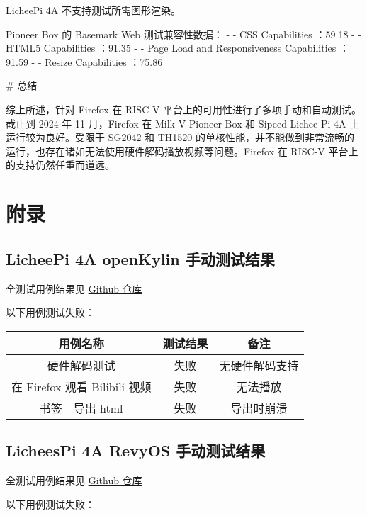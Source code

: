 \documentclass{article}
\begin{document}
\begin{markdown}
LicheePi 4A 不支持测试所需图形渲染。

Pioneer Box 的 Basemark Web 测试兼容性数据：
- - CSS Capabilities ：59.18%
- - HTML5 Capabilities ：91.35%
- - Page Load and Responsiveness Capabilities ：91.59%
- - Resize Capabilities ：75.86%

# 总结

综上所述，针对 Firefox 在 RISC-V 平台上的可用性进行了多项手动和自动测试。截止到 2024 年 11 月，Firefox 在 Milk-V Pioneer Box 和 Sipeed Lichee Pi 4A 上运行较为良好。受限于 SG2042 和 TH1520 的单核性能，并不能做到非常流畅的运行，也存在诸如无法使用硬件解码播放视频等问题。Firefox 在 RISC-V 平台上的支持仍然任重而道远。


\end{markdown}

\newpage
\section{附录}

\appendix

\subsection*{LicheePi 4A openKylin 手动测试结果}

全测试用例结果见 \href{https://github.com/QA-Team-lo/firefox_test/tree/main/l_ok}{Github 仓库}

以下用例测试失败：
\begin{table}[H]
\centering
\begin{tabular}{|c|c|c|}
\hline
\textbf{用例名称} & \textbf{测试结果} & \textbf{备注} \\ \hline
硬件解码测试 & 失败 & 无硬件解码支持 \\ \hline
在 Firefox 观看 Bilibili 视频 & 失败 & 无法播放 \\ \hline
书签 - 导出 html & 失败 & 导出时崩溃 \\ \hline
\end{tabular}
\end{table}

\subsection*{LicheesPi 4A RevyOS 手动测试结果}

全测试用例结果见 \href{https://github.com/QA-Team-lo/firefox_test/tree/main/l_re}{Github 仓库}

以下用例测试失败：
\end{document}
